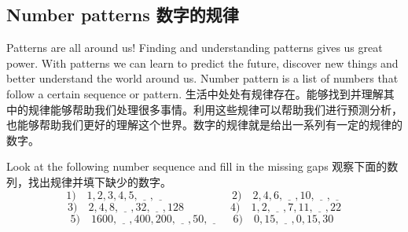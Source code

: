 \subsection{Number patterns 数字的规律}
\begin{paracol}{2}
Patterns are all around us! Finding and understanding patterns gives us great power. With patterns we can learn to predict the future, discover new things and better understand the world around us. Number pattern is a list of numbers that follow a certain sequence or pattern.
\switchcolumn
生活中处处有规律存在。能够找到并理解其中的规律能够帮助我们处理很多事情。利用这些规律可以帮助我们进行预测分析，也能够帮助我们更好的理解这个世界。数字的规律就是给出一系列有一定的规律的数字。
\end{paracol}


\begin{example}
Look at the following number sequence and fill in the missing gaps 观察下面的数列，找出规律并填下缺少的数字。
$$
1)\quad 1, 2, 3, 4, 5, \underline{\quad}, \underline{\quad} \quad\quad\quad \quad\quad\quad 2)\quad 2, 4, 6, \underline{\quad}, 10, \underline{\quad}, \underline{\quad}
$$
$$
3)\quad 2, 4, 8, \underline{\quad}, 32, \underline{\quad}, 128 \quad\quad\quad\quad\  4)\quad 1, 2, \underline{\quad}, 7, 11,  \underline{\quad}, 22
$$
$$
5)\quad 1600,\underline{\quad} , 400, 200, \underline{\quad}, 50, \underline{\quad}\quad\ 6)\quad 0, 15, \underline{\quad}, 0, 15, 30 \ \  
$$
\end{example}
